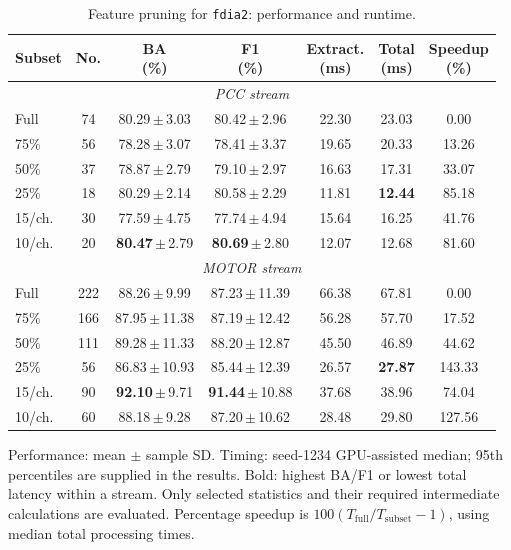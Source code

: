 \documentclass[letterpaper,journal]{IEEEtran}
\begin{document}
\begin{table}[t]
\centering
\scriptsize
\caption{Feature pruning for \texttt{fdia2}: performance and runtime.}
\label{tab:feature_pruning_anomaly2_runtime}
\renewcommand{\arraystretch}{1.15}
\setlength{\tabcolsep}{1.7pt}
\begin{tabular}{@{}lcccccc@{}}
\hline
Subset & No. & \shortstack{BA\\(\%)} & \shortstack{F1\\(\%)} & \shortstack{Extract.\\(ms)} & \shortstack{Total\\(ms)} & \shortstack{Speedup\\(\%)} \\\hline
\hline\multicolumn{7}{c}{\textit{PCC stream}} \\\hline
Full & 74 & \mbox{80.29\,$\pm$\,3.03} & \mbox{80.42\,$\pm$\,2.96} & 22.30 & 23.03 & 0.00 \\
75\% & 56 & \mbox{78.28\,$\pm$\,3.07} & \mbox{78.41\,$\pm$\,3.37} & 19.65 & 20.33 & 13.26 \\
50\% & 37 & \mbox{78.87\,$\pm$\,2.79} & \mbox{79.10\,$\pm$\,2.97} & 16.63 & 17.31 & 33.07 \\
25\% & 18 & \mbox{80.29\,$\pm$\,2.14} & \mbox{80.58\,$\pm$\,2.29} & 11.81 & \textbf{12.44} & 85.18 \\
15/ch. & 30 & \mbox{77.59\,$\pm$\,4.75} & \mbox{77.74\,$\pm$\,4.94} & 15.64 & 16.25 & 41.76 \\
10/ch. & 20 & \mbox{\textbf{80.47}\,$\pm$\,2.79} & \mbox{\textbf{80.69}\,$\pm$\,2.80} & 12.07 & 12.68 & 81.60 \\
\hline\multicolumn{7}{c}{\textit{MOTOR stream}} \\\hline
Full & 222 & \mbox{88.26\,$\pm$\,9.99} & \mbox{87.23\,$\pm$\,11.39} & 66.38 & 67.81 & 0.00 \\
75\% & 166 & \mbox{87.95\,$\pm$\,11.38} & \mbox{87.19\,$\pm$\,12.42} & 56.28 & 57.70 & 17.52 \\
50\% & 111 & \mbox{89.28\,$\pm$\,11.33} & \mbox{88.20\,$\pm$\,12.87} & 45.50 & 46.89 & 44.62 \\
25\% & 56 & \mbox{86.83\,$\pm$\,10.93} & \mbox{85.44\,$\pm$\,12.39} & 26.57 & \textbf{27.87} & 143.33 \\
15/ch. & 90 & \mbox{\textbf{92.10}\,$\pm$\,9.71} & \mbox{\textbf{91.44}\,$\pm$\,10.88} & 37.68 & 38.96 & 74.04 \\
10/ch. & 60 & \mbox{88.18\,$\pm$\,9.28} & \mbox{87.20\,$\pm$\,10.62} & 28.48 & 29.80 & 127.56 \\
\hline\end{tabular}
\par\smallskip\begin{minipage}{\columnwidth}\scriptsize Performance: mean $\pm$ sample SD. Timing: seed-1234 GPU-assisted median; 95th percentiles are supplied in the results. Bold: highest BA/F1 or lowest total latency within a stream. Only selected statistics and their required intermediate calculations are evaluated. Percentage speedup is $100(T_{\mathrm{full}}/T_{\mathrm{subset}}-1)$, using median total processing times.\end{minipage}
\end{table}
\end{document}
